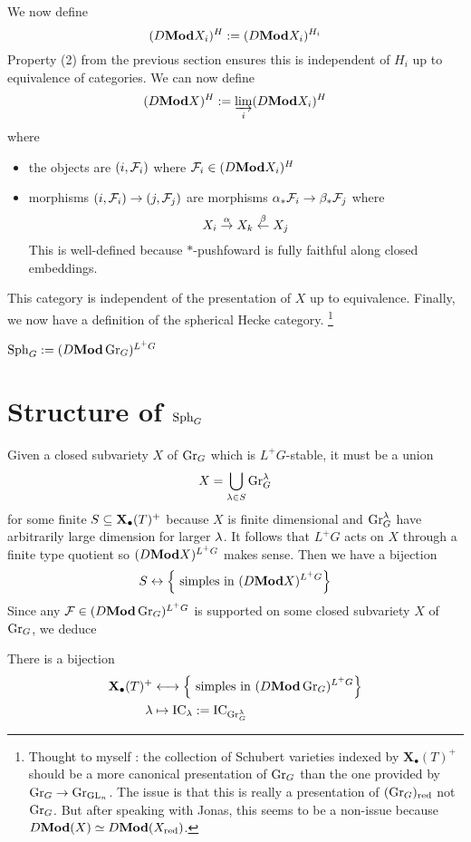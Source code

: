 \documentclass{article}
\begin{document}
We now define 
\[
  (D\mathbf{Mod} X_i)^H := (D\mathbf{Mod} X_i)^{H_i}
\]
Property (2) from the previous section ensures this is
independent of $H_i$ up to equivalence of categories.
We can now define
\[
  (D\mathbf{Mod} X)^H := \varinjlim_{i} (D\mathbf{Mod} X_i)^H
\]
where
\begin{itemize}
  \item the objects are $(i, \mathcal{F}_i)$ where $\mathcal{F}_i \in (D\mathbf{Mod} X_i)^H$
  \item morphisms $(i , \mathcal{F}_i) \to (j , \mathcal{F}_j)$ are
  morphisms $\alpha_* \mathcal{F}_i \to \beta_* \mathcal{F}_j$ where
  \[
    X_i \overset{\alpha}{\to} X_k \overset{\beta}{\leftarrow} X_j
  \]
  This is well-defined because $*$-pushfoward is fully faithful along
  closed embeddings.
\end{itemize}
This category is independent of the presentation of $X$
up to equivalence.
Finally, we now have a definition of the spherical Hecke category.
\footnote{
  Thought to myself : 
  the collection of Schubert varieties indexed by $\mathbf{X}_\bullet(T)^+$
  should be a more canonical presentation of $\operatorname{Gr}_G$
  than the one provided by $\operatorname{Gr}_G \to \operatorname{Gr}_{\operatorname{GL}_n}$.
  The issue is that this is really a presentation of $(\operatorname{Gr}_G)_{\mathrm{red}}$ not 
  $\operatorname{Gr}_G$.
  But after speaking with Jonas,
  this seems to be a non-issue because 
  $D\mathbf{Mod}(X) \simeq D\mathbf{Mod}(X_{\mathrm{red}})$.
}
\begin{dfn}

  $\operatorname{Sph}_G := (D\mathbf{Mod} \operatorname{Gr}_G)^{L^+ G}$
\end{dfn}

\section{Structure of $\operatorname{Sph}_G$}

Given a closed subvariety $X$ of $\operatorname{Gr}_G$ which is $L^+G$-stable,
it must be a union
\[
  X = \bigcup_{\lambda \in S} \operatorname{Gr}_G^\lambda
\]
for some finite $S \subseteq \mathbf{X}_\bullet(T)^+$
because $X$ is finite dimensional and 
$\operatorname{Gr}_G^\lambda$ have arbitrarily large dimension for larger $\lambda$.
It follows that $L^+G$ acts on $X$ through a finite type quotient
so $(D\mathbf{Mod} X)^{L^+G}$ makes sense.
Then we have a bijection
\[
  S \leftrightarrow \left\{\text{ simples in $(D\mathbf{Mod} X)^{L^+G}$}\right\}
\]
Since any $\mathcal{F} \in (D\mathbf{Mod} \operatorname{Gr}_G)^{L^+G}$ is supported on some
closed subvariety $X$ of $\operatorname{Gr}_G$,
we deduce
\begin{prop}

  There is a bijection 
  \begin{align*}
    \mathbf{X}_\bullet(T)^+ &\longleftrightarrow 
      \left\{\text{ simples in $(D\mathbf{Mod} \operatorname{Gr}_G)^{L^+ G}$}\right\} \\
    \lambda &\mapsto \mathrm{IC}_\lambda := \mathrm{IC}_{\operatorname{Gr}_G^\lambda}
  \end{align*}
\end{prop}
\end{document}

